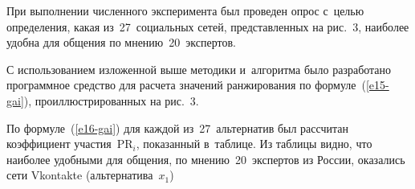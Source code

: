 \begin{multicols}{2}
\vspace*{-6pt}

  При выполнении численного эксперимента был проведен опрос с~целью 
определения, какая из~27~социальных сетей, представленных на рис.~3, 
наиболее удобна для общения по мнению~20~экспертов. 
  
  С использованием изложенной выше методики и~алгоритма было 
разработано программное средство для расчета значений ранжирования по 
формуле~(\ref{e15-gai}), проиллюстрированных на рис.~3.
   
  

  По формуле~(\ref{e16-gai}) для каждой из~27~альтернатив был рассчитан 
коэффициент участия~$\mathrm{PR}_i$, показанный в~таблице.
    Из таблицы видно, что наиболее удобными для общения, по 
мнению~20~экспертов из России, оказались сети
 Vkontakte (альтернатива~$x_1$)\linebreak\vspace*{-10pt}

\pagebreak


\end{multicols}

